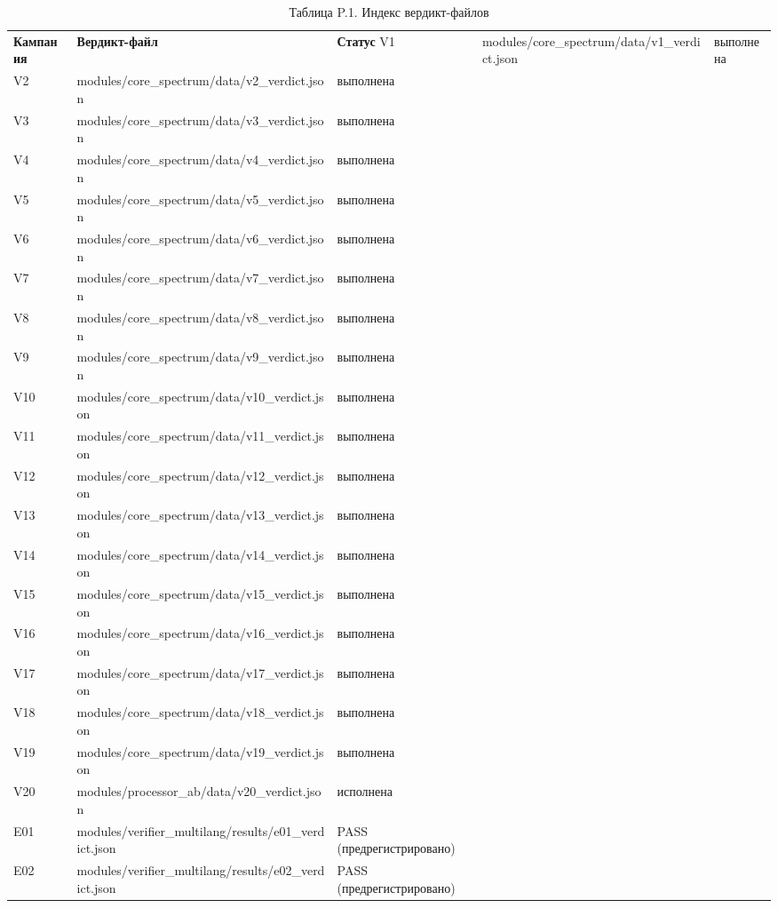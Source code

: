 \documentclass[11pt,a4paper]{article}
\begin{document}
\begin{table}[htbp]\centering\small
\caption{Таблица P.1. Индекс вердикт-файлов}
\begin{tabular}{p{} p{} p{}}
\toprule
\textbf{Кампания} & \textbf{Вердикт-файл} & \textbf{Статус}
\midrule
V1 & modules/core\_spectrum/data/v1\_verdict.json & выполнена \\
V2 & modules/core\_spectrum/data/v2\_verdict.json & выполнена \\
V3 & modules/core\_spectrum/data/v3\_verdict.json & выполнена \\
V4 & modules/core\_spectrum/data/v4\_verdict.json & выполнена \\
V5 & modules/core\_spectrum/data/v5\_verdict.json & выполнена \\
V6 & modules/core\_spectrum/data/v6\_verdict.json & выполнена \\
V7 & modules/core\_spectrum/data/v7\_verdict.json & выполнена \\
V8 & modules/core\_spectrum/data/v8\_verdict.json & выполнена \\
V9 & modules/core\_spectrum/data/v9\_verdict.json & выполнена \\
V10 & modules/core\_spectrum/data/v10\_verdict.json & выполнена \\
V11 & modules/core\_spectrum/data/v11\_verdict.json & выполнена \\
V12 & modules/core\_spectrum/data/v12\_verdict.json & выполнена \\
V13 & modules/core\_spectrum/data/v13\_verdict.json & выполнена \\
V14 & modules/core\_spectrum/data/v14\_verdict.json & выполнена \\
V15 & modules/core\_spectrum/data/v15\_verdict.json & выполнена \\
V16 & modules/core\_spectrum/data/v16\_verdict.json & выполнена \\
V17 & modules/core\_spectrum/data/v17\_verdict.json & выполнена \\
V18 & modules/core\_spectrum/data/v18\_verdict.json & выполнена \\
V19 & modules/core\_spectrum/data/v19\_verdict.json & выполнена \\
V20 & modules/processor\_ab/data/v20\_verdict.json & исполнена \\
E01 & modules/verifier\_multilang/results/e01\_verdict.json & PASS (предрегистрировано) \\
E02 & modules/verifier\_multilang/results/e02\_verdict.json & PASS (предрегистрировано) \\

\end{tabular}
\end{table}
\end{document}
